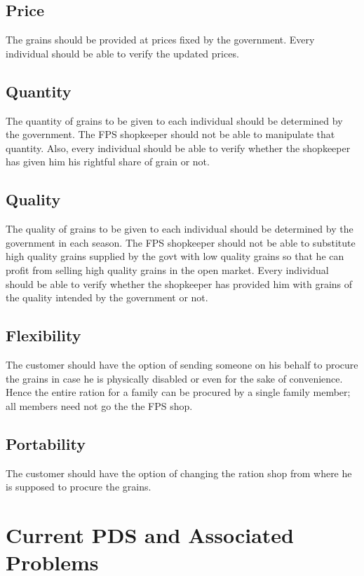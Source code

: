 \documentclass{article}
\begin{document}
\subsection{Price}

The grains should be provided at prices fixed by the government. Every individual should be able to verify the updated prices.
    
 \subsection{Quantity}
 The quantity of grains to be given to each individual should be determined by the government. The FPS shopkeeper should not be able to manipulate that quantity. Also, every individual should be able to verify whether the shopkeeper has given him his rightful share of grain or not.
 
 \subsection{Quality}
 The quality of grains to be given to each individual should be determined by the government in each season. The FPS shopkeeper should not be able to substitute high quality grains supplied by the govt with low quality grains so that he can profit from selling high quality grains in the open market. Every individual should be able to verify whether the shopkeeper has provided him with grains of the quality intended by the government or not.
 
 \subsection{Flexibility}
 The customer should have the option of sending someone on his behalf to procure the grains in case he is physically disabled or even for the sake of convenience. Hence the entire ration for a family can be procured by a single family member; all members need not go the the FPS shop.
 
 \subsection{Portability}
The customer should have the option of changing the ration shop from where  he is supposed to procure the grains.
    
\section{Current PDS and Associated Problems}
\end{document}
